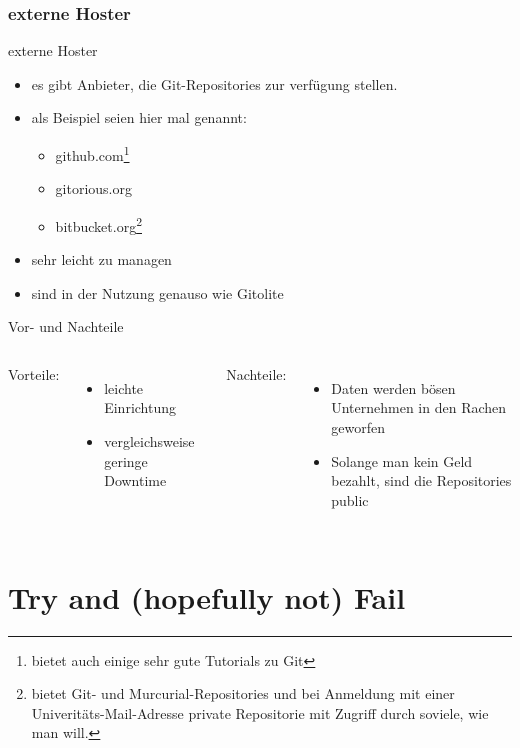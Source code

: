 \documentclass{beamer}
\begin{document}
\subsubsection{externe Hoster}
\begin{frame}{externe Hoster}
	\begin{itemize}
		\item es gibt Anbieter, die Git-Repositories zur verfügung stellen.
		\item als Beispiel seien hier mal genannt:
			\begin{itemize}
				\item github.com\footnote{bietet auch einige sehr gute Tutorials zu Git}
				\item gitorious.org
				\item bitbucket.org\footnote{bietet Git- und Murcurial-Repositories und bei Anmeldung mit einer Univeritäts-Mail-Adresse private Repositorie mit Zugriff durch soviele, wie man will.}
			\end{itemize}
		\item sehr leicht zu managen
		\item sind in der Nutzung genauso wie Gitolite
	\end{itemize}
\end{frame}

\begin{frame}{Vor- und Nachteile}
	\begin{columns}[c]
		Vorteile:
		\begin{itemize}
			\item leichte Einrichtung
			\item vergleichsweise geringe Downtime
		\end{itemize}
		Nachteile:
		\begin{itemize}
			\item Daten werden bösen Unternehmen in den Rachen geworfen
			\item Solange man kein Geld bezahlt, sind die Repositories public
		\end{itemize}
	\end{columns}
\end{frame}

\section{Try and (hopefully not) Fail}
\end{document}
